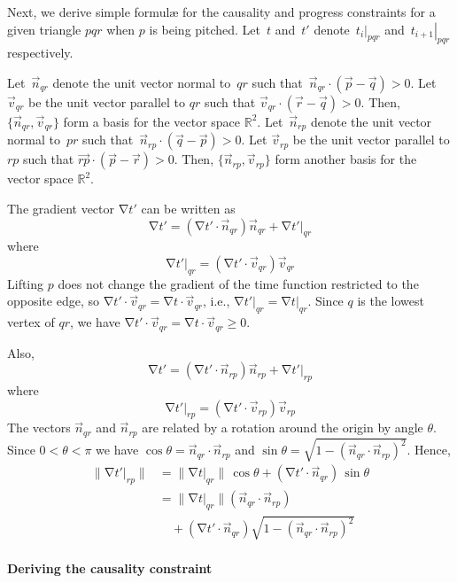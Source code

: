 \documentclass[twocolumn]{article}
\def\Real{\ensuremath{\mathbb{R}}}
\DeclareMathOperator{\grad}{\ensuremath{\nabla}}
\def\norm#1{\ensuremath{\mathopen\| #1 \mathclose\|}}
\def\rest#1#2{\ensuremath{\left. #1 \right|_{#2}}}
\begin{document}
Next, we derive simple formul\ae{} for the causality and progress
constraints for a given triangle $pqr$ when $p$ is
being pitched.  Let~$t$ and~$t'$
denote~$\rest{t_i}{pqr}$
and~$\rest{t_{i+1}}{pqr}$ respectively.

Let~$\vec{n}_{qr}$ denote the unit vector normal to~$qr$ such
that~$\vec{n}_{qr} \cdot (\vec{p} - \vec{q}) > 0$.  Let $\vec{v}_{qr}$
be the unit vector parallel to $qr$ such that $\vec{v}_{qr} \cdot
(\vec{r} - \vec{q}) > 0$.  Then, $\{\vec{n}_{qr}, \vec{v}_{qr}\}$ form
a basis for the vector space $\Real^2$.  Let~$\vec{n}_{rp}$ denote the
unit vector normal to~$pr$ such that~$\vec{n}_{rp} \cdot (\vec{q} -
\vec{p}) > 0$.  Let $\vec{v}_{rp}$ be the unit vector parallel to $rp$
such that $\vec{rp} \cdot (\vec{p} - \vec{r}) > 0$.  Then,
$\{\vec{n}_{rp}, \vec{v}_{rp}\}$ form another basis for the vector
space $\Real^2$.

The gradient vector $\grad t'$ can be written as
\[
  \grad t'
=
  (\grad t' \cdot \vec{n}_{qr}) \vec{n}_{qr}
+
  \grad \rest{t'}{qr}
\]
where
\[
  \grad \rest{t'}{qr}
=
  (\grad t' \cdot \vec{v}_{qr}) \vec{v}_{qr}
\]
Lifting $p$ does not change the gradient of the time function
restricted to the opposite edge, so $\grad t' \cdot \vec{v}_{qr} =
\grad t \cdot \vec{v}_{qr}$, i.e., $\grad \rest{t'}{qr} = \grad
\rest{t}{qr}$.  Since $q$ is the lowest vertex of $qr$, we have $\grad
t' \cdot \vec{v}_{qr} = \grad t \cdot \vec{v}_{qr} \ge 0$.

Also,
\[
  \grad t'
=
  (\grad t' \cdot \vec{n}_{rp}) \vec{n}_{rp}
+
  \grad \rest{t'}{rp}
\]
where
\[
  \grad \rest{t'}{rp}
=
  (\grad t' \cdot \vec{v}_{rp}) \vec{v}_{rp}
\]
The vectors $\vec{n}_{qr}$ and $\vec{n}_{rp}$ are related by a rotation
around the origin by angle $\theta$.  Since $0 < \theta < \pi$ we have
$\cos \theta = \vec{n}_{qr} \cdot \vec{n}_{rp}$ and $\sin \theta = \sqrt{1 -
  (\vec{n}_{qr} \cdot \vec{n}_{rp})^2}$.  Hence,
\begin{align}
  \norm{\grad \rest{t'}{rp}}
&=
  \norm{\grad \rest{t}{qr}} \, \cos \theta
+
  (\grad t' \cdot \vec{n}_{qr}) \, \sin \theta \nonumber\\
&=
  \norm{\grad \rest{t}{qr}} (\vec{n}_{qr} \cdot \vec{n}_{rp}) \nonumber\\
&\quad {}+{}
  (\grad t' \cdot \vec{n}_{qr}) \sqrt{1 - (\vec{n}_{qr} \cdot \vec{n}_{rp})^2}
\label{eqn:2d:rotatebytheta}
\end{align}



\paragraph{Deriving the causality constraint}
\end{document}

